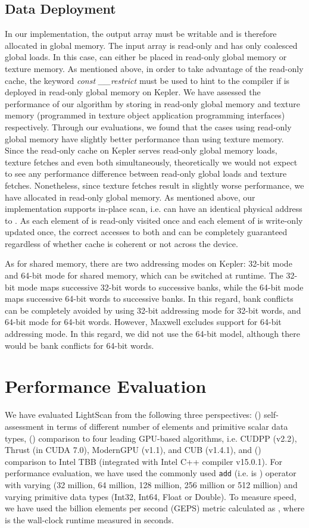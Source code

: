 \documentclass[article]{elsarticle}
\begin{document}
{\subsection{Data Deployment}
In our implementation, the output array  must be writable and is therefore allocated in global memory. The input array  is read-only and has only coalesced global loads. In this case,  can either be placed in read-only global memory or texture memory. As mentioned above, in order to take advantage of the read-only cache, the keyword \textit{const \_\_restrict} must be used to hint to the compiler if  is deployed in read-only global memory on Kepler. We have assessed the performance of our algorithm by storing  in read-only global memory and texture memory (programmed in texture object application programming interfaces) respectively. Through our evaluations, we found that the cases using read-only global memory have slightly better performance than using texture memory. Since the read-only cache on Kepler serves read-only global memory loads, texture fetches and even both simultaneously, theoretically we would not expect to see any performance difference between read-only global loads and texture fetches. Nonetheless, since texture fetches result in slightly worse performance, we have allocated  in read-only global memory. As mentioned above, our implementation supports in-place scan, i.e.  can have an identical physical address to . As each element of  is read-only visited once and each element of  is write-only updated once, the correct accesses to both  and  can be completely guaranteed regardless of whether cache is coherent or not across the device.

As for shared memory, there are two addressing modes on Kepler: 32-bit mode and 64-bit mode for shared memory, which can be switched at runtime. The 32-bit mode maps successive 32-bit words to successive banks, while the 64-bit mode maps successive 64-bit words to successive banks. In this regard, bank conflicts can be completely avoided by using 32-bit addressing mode for 32-bit words, and 64-bit mode for 64-bit words. However, Maxwell excludes support for 64-bit addressing mode. In this regard, we did not use the 64-bit model, although there would be bank conflicts for 64-bit words.
\section{Performance Evaluation}
\label{sec:results}
We have evaluated LightScan from the following three perspectives: () self-assessment in terms of different number of elements  and primitive scalar data types, () comparison to four leading GPU-based algorithms, i.e. CUDPP (v2.2), Thrust (in CUDA 7.0), ModernGPU (v1.1), and CUB (v1.4.1), and () comparison to Intel TBB (integrated with Intel C++ compiler v15.0.1). For performance evaluation, we have used the commonly used {\tt add} (i.e.  is ) operator with varying  (32 million, 64 million, 128 million, 256 million or 512 million) and varying primitive data types (Int32, Int64, Float or Double). To measure speed, we have used the billion elements per second (GEPS) metric calculated as \mbox{}, where  is the wall-clock runtime measured in seconds. 

}
\end{document}
